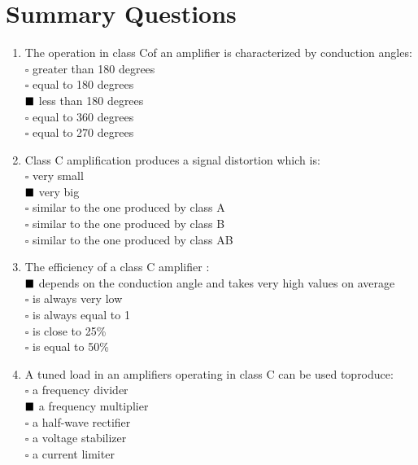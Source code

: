 \documentclass[12pt,a4paper]{report}
\begin{document}
\section{Summary Questions}
\begin{enumerate}
    \item The operation in class Cof an amplifier is characterized by conduction angles:\\
    
\(\square\) greater than 180 degrees\\
\(\square\) equal to 180 degrees\\
\(\textcolor{black}{\blacksquare}\) less than 180 degrees\\
\(\square\) equal to 360 degrees\\
\(\square\) equal to 270 degrees

\item Class C amplification produces a signal distortion which is:\\
\(\square\) very small\\
\(\textcolor{black}{\blacksquare}\) very big\\
\(\square\) similar to the one produced by class A\\
\(\square\) similar to the one produced by class B\\
\(\square\) similar to the one produced by class AB

\item The efficiency of a class C amplifier :\\
\(\textcolor{black}{\blacksquare}\) depends on the conduction angle and takes very high values on average\\
\(\square\) is always very low\\
\(\square\) is always equal to 1\\
\(\square\) is close to 25\% \\
\(\square\) is equal to 50\% \\

\item A tuned load in an amplifiers operating in class C can be used toproduce:\\

\(\square\) a frequency divider\\
\(\textcolor{black}{\blacksquare}\) a frequency multiplier\\
\(\square\) a half-wave rectifier\\
\(\square\) a voltage stabilizer\\
\(\square\) a current limiter
\end{enumerate}
\end{document}
